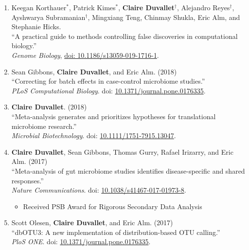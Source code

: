 \documentclass[10pt]{article}
\makeatletter
\newlength{\bibhang}
\newlength{\bibsep}
 {\@listi \global\bibsep\itemsep \global\advance\bibsep by\parsep}
\newenvironment{bibsection}%
        {\begin{enumerate}{}{%
       \setlength{\leftmargin}{\bibhang}%
       \setlength{\itemindent}{-\leftmargin}%
       \setlength{\itemsep}{\bibsep}%
       \setlength{\parsep}{\z@}%
        \setlength{\partopsep}{0pt}%
        \setlength{\topsep}{0pt}}}
        {\end{enumerate}\vspace{-.6\baselineskip}}
\makeatother
\begin{document}
\begin{bibsection}
	\item Keegan Korthauer$^{*}$, Patrick Kimes$^{*}$, \textbf{Claire Duvallet}$^{\dagger}$,  Alejandro Reyes$^{\dagger}$,  Ayshwarya Subramanian$^{\dagger}$, Mingxiang Teng, Chinmay Shukla, Eric Alm, and Stephanie Hicks. \\
		``A practical guide to methods controlling false discoveries in computational biology.''  \\
		\textit{Genome Biology}, \href{https://doi.org/10.1186/s13059-019-1716-1}{doi: 10.1186/s13059-019-1716-1}.
		
	\item Sean Gibbons, \textbf{Claire Duvallet}, and Eric Alm. (2018) \\ 
		``Correcting for batch effects in case-control microbiome studies.'' \\ 
		\emph{PLoS Computational Biology}. doi: \href{https://doi.org/10.1371/journal.pcbi.1006102}{10.1371/journal.pone.0176335}.
		
	\item \textbf{Claire Duvallet}. (2018) \\ 
		``Meta-analysis generates and prioritizes hypotheses for translational microbiome research.'' \\ 
		\emph{Microbial Biotechnology}. doi: \href{https://doi.org/10.1111/1751-7915.13047}{10.1111/1751-7915.13047}.
		
	\item \textbf{Claire Duvallet}, Sean Gibbons, Thomas Gurry, Rafael  Irizarry, and Eric Alm. (2017) \\ 
		``Meta-analysis of gut microbiome studies identifies disease-specific and shared responses.'' \\ 
		\emph{Nature Communications}. doi: \href{https://doi.org/10.1038/s41467-017-01973-8}{10.1038/s41467-017-01973-8}.
		
		\begin{itemize}
			\item Received PSB Award for Rigorous Secondary Data Analysis 
		\end{itemize}		
				
	\item Scott Olesen, \textbf{Claire Duvallet}, and Eric Alm. (2017) \\ 
		``dbOTU3: A new implementation of distribution-based OTU calling.'' \\ 
		\emph{PloS ONE}. doi: \href{https://doi.org/10.1371/journal.pone.0176335}{10.1371/journal.pone.0176335}.


\end{bibsection}
\end{document}

